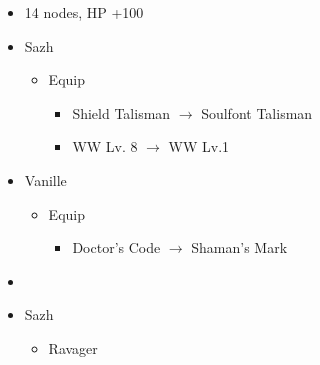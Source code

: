 \begin{paracol}{2}
\begin{menu}
\begin{itemize}
\begin{itemize}
\begin{itemize}
\begin{itemize}
						            \item 14 nodes, HP +100
					            \end{itemize}
				      \end{itemize}
			\end{itemize}
			\equip
			\begin{itemize}
				\item Sazh
				      \begin{itemize}
					      \item Equip
					            \begin{itemize}
						            \item Shield Talisman $\rightarrow$ Soulfont Talisman
						            \item WW Lv. 8 $\rightarrow$ WW Lv.1
					            \end{itemize}
				      \end{itemize}
				\item Vanille
				      \begin{itemize}
					      \item Equip
					            \begin{itemize}
						            \item Doctor's Code $\rightarrow$ Shaman's Mark
					            \end{itemize}
				      \end{itemize}
			\end{itemize}
		\end{itemize}
	\end{menu}
	\switchcolumn
	\begin{menu}
		\begin{itemize}
			\paradigm
			\begin{itemize}
				\item {}%
				      {\paradigmline[1]{\textit{\syn}}{\textit{\sab}}{\textit{\rav}}}%
				      {\paradigmline{\com}{\med}{\com}}%
				      {\paradigmline{\syn}{\med}{\com}}%
				      {\paradigmline{\com}{\sab}{\com}}%
				      {\paradigmline{(\rav)}{\sab}{(\rav)}}%
				      {\paradigmline{\com}{\rav}{\com}}
			\end{itemize}
			\crystarium
			\begin{itemize}
				\item Sazh
				      \begin{itemize}
					      \item Ravager
					            \begin{itemize}

\end{itemize}
\end{itemize}
\end{itemize}
\end{itemize}
\end{menu}
\end{paracol}
